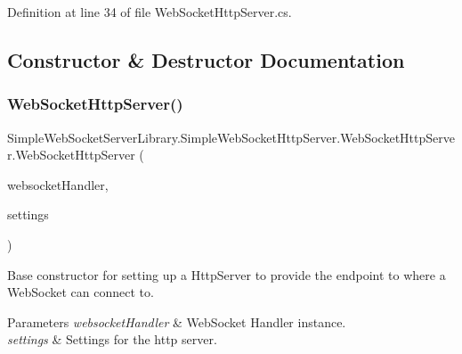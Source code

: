 Definition at line 34 of file Web\+Socket\+Http\+Server.\+cs.



\subsection{Constructor \& Destructor Documentation}
\mbox{\label{class_simple_web_socket_server_library_1_1_simple_web_socket_http_server_1_1_web_socket_http_server_aa8e23540cfef48f5304591d1251f0f63}} 
\subsubsection{\texorpdfstring{Web\+Socket\+Http\+Server()}{WebSocketHttpServer()}}
{\footnotesize\ttfamily Simple\+Web\+Socket\+Server\+Library.\+Simple\+Web\+Socket\+Http\+Server.\+Web\+Socket\+Http\+Server.\+Web\+Socket\+Http\+Server (\begin{DoxyParamCaption}\item[{\mbox{\hyperlink{interface_simple_web_socket_server_library_1_1_simple_web_socket_handler_1_1_i_web_socket_handler}{I\+Web\+Socket\+Handler}}}]{websocket\+Handler,  }\item[{\mbox{\hyperlink{class_simple_web_socket_server_library_1_1_simple_web_socket_server_settings}{Simple\+Web\+Socket\+Server\+Settings}}}]{settings }\end{DoxyParamCaption})}



Base constructor for setting up a Http\+Server to provide the endpoint to where a Web\+Socket can connect to. 


\begin{DoxyParams}{Parameters}
{\em websocket\+Handler} & Web\+Socket Handler instance.\\
\hline
{\em settings} & Settings for the http server.\\
\hline
\end{DoxyParams}


